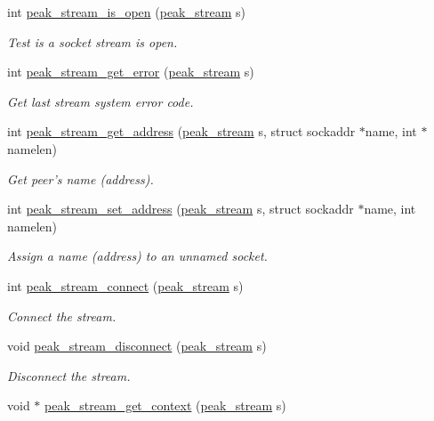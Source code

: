 \begin{CompactItemize}
int \hyperlink{group__stream__common_ga3}{peak\_\-stream\_\-is\_\-open} (\hyperlink{group__stream_ga0}{peak\_\-stream} s)
\begin{CompactList}\small\item\em Test is a socket stream is open. \item\end{CompactList}\item 
int \hyperlink{group__stream__common_ga4}{peak\_\-stream\_\-get\_\-error} (\hyperlink{group__stream_ga0}{peak\_\-stream} s)
\begin{CompactList}\small\item\em Get last stream system error code. \item\end{CompactList}\item 
int \hyperlink{group__stream__common_ga5}{peak\_\-stream\_\-get\_\-address} (\hyperlink{group__stream_ga0}{peak\_\-stream} s, struct sockaddr $\ast$name, int $\ast$namelen)
\begin{CompactList}\small\item\em Get peer's name (address). \item\end{CompactList}\item 
int \hyperlink{group__stream__common_ga6}{peak\_\-stream\_\-set\_\-address} (\hyperlink{group__stream_ga0}{peak\_\-stream} s, struct sockaddr $\ast$name, int namelen)
\begin{CompactList}\small\item\em Assign a name (address) to an unnamed socket. \item\end{CompactList}\item 
int \hyperlink{group__stream__common_ga7}{peak\_\-stream\_\-connect} (\hyperlink{group__stream_ga0}{peak\_\-stream} s)
\begin{CompactList}\small\item\em Connect the stream. \item\end{CompactList}\item 
void \hyperlink{group__stream__common_ga8}{peak\_\-stream\_\-disconnect} (\hyperlink{group__stream_ga0}{peak\_\-stream} s)
\begin{CompactList}\small\item\em Disconnect the stream. \item\end{CompactList}\item 
void $\ast$ \hyperlink{group__stream__common_ga9}{peak\_\-stream\_\-get\_\-context} (\hyperlink{group__stream_ga0}{peak\_\-stream} s)

\end{CompactItemize}
